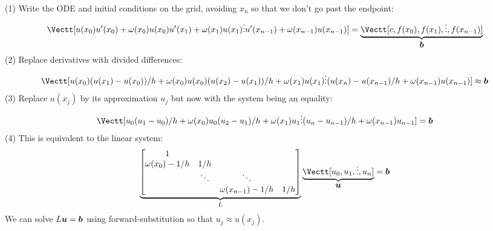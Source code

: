 (1) Write the ODE and initial conditions on the grid, avoiding $x_n$ so that we don't go past the endpoint:
\[
\Vectt[u(x_0) \\ 
u'(x_0) + \ensuremath{\omega}(x_0) u(x_0) \\
u'(x_1) + \ensuremath{\omega}(x_1) u(x_1) \\
\ensuremath{\vdots} \\
u'(x_{n-1})+ \ensuremath{\omega}(x_{n-1}) u(x_{n-1})] = \underbrace{\Vectt[c, f(x_0), f(x_1), \ensuremath{\vdots} , f(x_{n-1})]}_{\ensuremath{\bm{\b}}}
\]
(2) Replace derivatives with divided differences:
\[
\Vectt[u(x_0) \\ 
(u(x_1) - u(x_0))/h + \ensuremath{\omega}(x_0)u(x_0) \\
(u(x_2) - u(x_1))/h + \ensuremath{\omega}(x_1)u(x_1) \\
\ensuremath{\vdots} \\
(u(x_n) - u(x_{n-1})/h + \ensuremath{\omega}(x_{n-1})u(x_{n-1})] \ensuremath{\approx} \ensuremath{\bm{\b}}
\]
(3) Replace $u(x_j)$  by its approximation $u_j$ but now with the system being an equality:
\[
\Vectt[u_0 \\ 
(u_1 - u_0)/h + \ensuremath{\omega}(x_0) u_0 \\
(u_2 - u_1)/h + \ensuremath{\omega}(x_1) u_1 \\
\ensuremath{\vdots} \\
(u_n - u_{n-1})/h  + \ensuremath{\omega}(x_{n-1}) u_{n-1}] = \ensuremath{\bm{\b}}
\]
(4) This is equivalent to the linear system:
\[
\underbrace{\begin{bmatrix}
    1 \\ 
    \ensuremath{\omega}(x_0)-1/h & 1/h \\
    & \ensuremath{\ddots} & \ensuremath{\ddots} \\
    && \ensuremath{\omega}(x_{n-1})-1/h & 1/h \end{bmatrix}}_L \underbrace{\Vectt[u_0,u_1,\ensuremath{\vdots},u_n]}_{\ensuremath{\bm{\u}}} = \ensuremath{\bm{\b}}
\]
We can solve $L \bm{{\mbox{\boldmath$u$\unboldmath}}} = \bm{{\mbox{\boldmath$b$\unboldmath}}}$ using forward-substitution so that $u_j \ensuremath{\approx} u(x_j)$.

